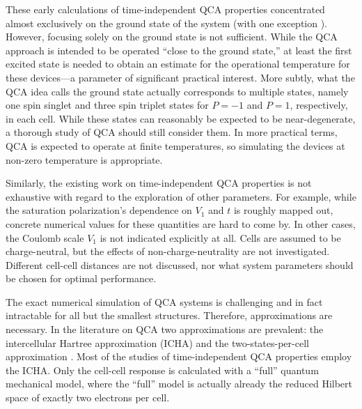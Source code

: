 These early calculations of time-independent QCA properties concentrated almost
exclusively on the ground state of the system (with one exception
\cite{tougaw1993bistable}). However, focusing solely on the ground state is not
sufficient. While the QCA approach is intended to be operated ``close to the
ground state,'' at least the first excited state is needed to obtain an estimate
for the operational temperature for these devices---a parameter of significant
practical interest. More subtly, what the QCA idea calls the ground state
actually corresponds to multiple states, namely one spin singlet and three spin
triplet states for $P=-1$ and $P=1$, respectively, in each cell. While these
states can reasonably be expected to be near-degenerate, a thorough study of QCA
should still consider them. In more practical terms, QCA is expected to operate
at finite temperatures, so simulating the devices at non-zero temperature is
appropriate. 

%
Similarly, the existing work on time-independent QCA properties is
not exhaustive with regard to the exploration of other parameters. For example,
while the saturation polarization's dependence on $V_1$ and $t$ is roughly
mapped out, concrete numerical values for these quantities are hard to come by.
In other cases, the Coulomb scale $V_1$ is not indicated explicitly at all.
Cells are assumed to be charge-neutral, but the effects of non-charge-neutrality
are not investigated.  Different cell-cell distances are not discussed, nor what
system parameters should be chosen for optimal performance.

The exact numerical simulation of QCA systems is challenging and in fact
intractable for all but the smallest structures. Therefore, approximations are
necessary. In the literature on QCA two approximations are prevalent: the
intercellular Hartree approximation (ICHA) and the two-states-per-cell
approximation \cite{lent1993quantum} \cite{tougaw1996dynamic}. Most of the
studies of time-independent QCA properties employ the ICHA. Only the cell-cell
response is calculated with a ``full'' quantum mechanical model, where the
``full'' model is actually already the reduced Hilbert space of exactly two
electrons per cell. 

